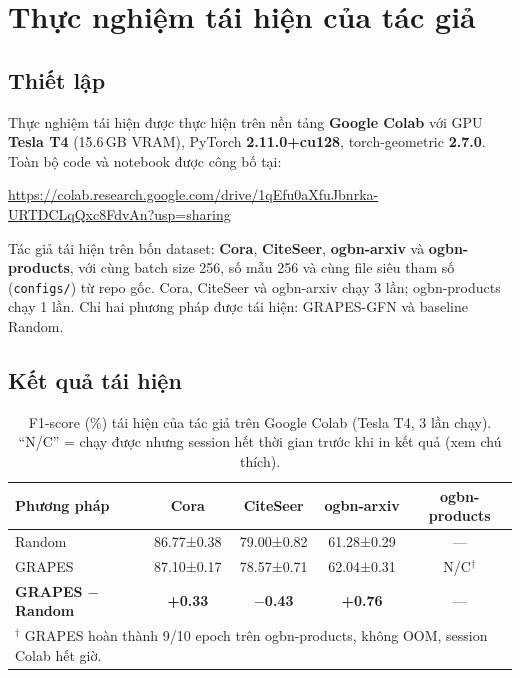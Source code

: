 \section{Thực nghiệm tái hiện của tác giả}

\subsection{Thiết lập}

Thực nghiệm tái hiện được thực hiện trên nền tảng \textbf{Google Colab} với GPU \textbf{Tesla T4} (15.6\,GB VRAM), PyTorch \textbf{2.11.0+cu128}, torch-geometric \textbf{2.7.0}. Toàn bộ code và notebook được công bố tại:
\begin{center}
\url{https://colab.research.google.com/drive/1qEfu0aXfuJbnrka-URTDCLqQxc8FdvAn?usp=sharing}
\end{center}

Tác giả tái hiện trên bốn dataset: \textbf{Cora}, \textbf{CiteSeer}, \textbf{ogbn-arxiv} và \textbf{ogbn-products}, với cùng batch size 256, số mẫu 256 và cùng file siêu tham số (\texttt{configs/}) từ repo gốc. Cora, CiteSeer và ogbn-arxiv chạy 3 lần; ogbn-products chạy 1 lần. Chỉ hai phương pháp được tái hiện: GRAPES-GFN và baseline Random.

\subsection{Kết quả tái hiện}

\begin{table}[H]
\centering
\caption{F1-score (\%) tái hiện của tác giả trên Google Colab (Tesla T4, 3 lần chạy). ``N/C'' = chạy được nhưng session hết thời gian trước khi in kết quả (xem chú thích).}
\label{tab:reproduce_f1}
\small
\setlength{\tabcolsep}{6pt}
\begin{tabular}{l c c c c}
\toprule
\textbf{Phương pháp} & \textbf{Cora} & \textbf{CiteSeer} & \textbf{ogbn-arxiv} & \textbf{ogbn-products} \\
\midrule
Random & 86.77±0.38 & 79.00±0.82 & 61.28±0.29 & --- \\
GRAPES & 87.10±0.17 & 78.57±0.71 & 62.04±0.31 & N/C$^\dagger$ \\
\midrule
\textbf{GRAPES $-$ Random} & \textbf{+0.33} & \textbf{$-$0.43} & \textbf{+0.76} & --- \\
\bottomrule
\multicolumn{5}{l}{\footnotesize $^\dagger$ GRAPES hoàn thành 9/10 epoch trên ogbn-products, không OOM, session Colab hết giờ.}
\end{tabular}
\end{table}

